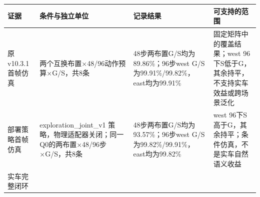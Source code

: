 \documentclass[]{article}
\begin{document}
\begin{longtable}[]{@{}llll@{}}
\toprule
\begin{minipage}[b]{0.22\columnwidth}\raggedright
证据\strut
\end{minipage} & \begin{minipage}[b]{0.22\columnwidth}\raggedright
条件与独立单位\strut
\end{minipage} & \begin{minipage}[b]{0.22\columnwidth}\raggedright
记录结果\strut
\end{minipage} & \begin{minipage}[b]{0.22\columnwidth}\raggedright
可支持的范围\strut
\end{minipage}\tabularnewline
\midrule
\endhead
\begin{minipage}[t]{0.22\columnwidth}\raggedright
原v10.3.1首帧仿真\strut
\end{minipage} & \begin{minipage}[t]{0.22\columnwidth}\raggedright
两个互换布置×48/96动作预算×G/S，共8条\strut
\end{minipage} & \begin{minipage}[t]{0.22\columnwidth}\raggedright
48步两布置G/S均为89.86\%；96步west
G/S为99.91\%/99.82\%，east均为99.91\%\strut
\end{minipage} & \begin{minipage}[t]{0.22\columnwidth}\raggedright
固定矩阵中的覆盖结果；west
96下S低于G，其余持平，不支持实车效益或跨场景泛化\strut
\end{minipage}\tabularnewline
\begin{minipage}[t]{0.22\columnwidth}\raggedright
部署策略首帧仿真\strut
\end{minipage} & \begin{minipage}[t]{0.22\columnwidth}\raggedright
exploration\_joint\_v1
策略，物理适配器关闭；同一Q0的两布置×48/96步×G/S，共8条\strut
\end{minipage} & \begin{minipage}[t]{0.22\columnwidth}\raggedright
48步两布置G/S均为93.57\%；96步west
G/S为99.82\%/99.91\%，east均为99.82\%\strut
\end{minipage} & \begin{minipage}[t]{0.22\columnwidth}\raggedright
west 96下S高于G，其余持平；条件仿真，不是实车自然语义收益\strut
\end{minipage}\tabularnewline
\begin{minipage}[t]{0.22\columnwidth}\raggedright
实车完整闭环\strut
\end{minipage} & \begin{minipage}[t]{0.22\columnwidth}\raggedright

\end{minipage}
\end{longtable}
\end{document}
